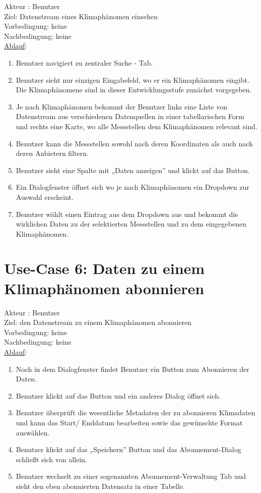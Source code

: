 \documentclass[a4paper,12pt]{scrreprt}
\begin{document}
	Akteur : Benutzer\\
	Ziel: Datenstream eines Klimaphänomen einsehen\\
	Vorbedingung: keine\\
	Nachbedingung: keine\\
	\underline{Ablauf}:
	\begin{enumerate}
		\item Benutzer navigiert zu zentraler Suche - Tab.
		\item Benutzer sieht nur einzigen Eingabefeld, wo er ein Klimaphänomen eingibt. Die Klimaphänomene sind in dieser Entwicklungsstufe zunächst vorgegeben.
		\item Je nach Klimaphänomen bekommt der Benutzer links eine Liste von Datenstream aus verschiedenen Datenquellen in einer tabellarischen Form und rechts eine Karte, wo alle Messstellen dem Klimaphänomen relevant sind.
		\item Benutzer kann die Messstellen sowohl nach deren Koordinaten als auch nach deren Anbietern filtern.
		\item Benutzer sieht eine Spalte mit „Daten anzeigen” und klickt auf das Button.
		\item Ein Dialogfenster öffnet sich wo je nach Klimaphänomen ein Dropdown zur Auswahl erscheint.
		\item Benutzer wählt einen Eintrag aus dem Dropdown aus und bekommt die wirklichen Daten zu der selektierten Messstellen und zu dem eingegebenen Klimaphänomen.
	\end{enumerate}
	
	\section*{\small \textbf{Use-Case 6: Daten zu einem Klimaphänomen abonnieren}}
	Akteur : Benutzer\\
	Ziel: den Datenstream zu einem Klimaphänomen abonnieren\\
	Vorbedingung: keine\\
	Nachbedingung: keine\\
	\underline{Ablauf}:
	\begin{enumerate}
		\item Noch in dem Dialogfenster findet Benutzer ein Button zum Abonnieren der Daten. 
		\item Benutzer klickt auf das Button und ein anderes Dialog öffnet sich.
		\item Benutzer überprüft die wesentliche Metadaten der zu abonnieren Klimadaten und kann das Start/ Enddatum bearbeiten sowie das gewünschte Format auswählen.
		\item Benutzer klickt auf das „Speichern” Button und  das Abonnement-Dialog schließt sich von allein.
		\item Benutzer wechselt zu einer sogenannten Abonnement-Verwaltung Tab und sieht den eben abonnierten Datensatz in einer Tabelle.
	\end{enumerate}
	
\end{document}
